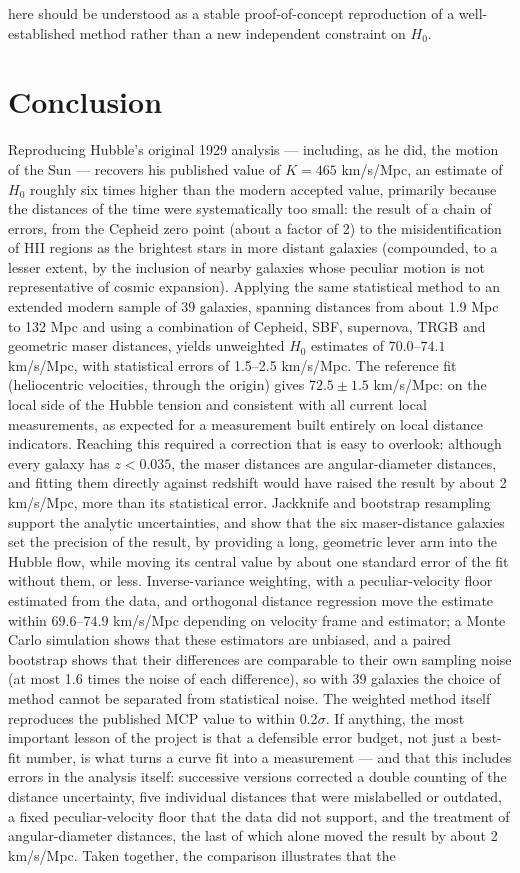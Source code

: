 \documentclass[11pt]{article}
\begin{document}
here should be understood as a stable proof-of-concept reproduction of a well-established method rather than a new independent constraint on $H_0$.
\section{Conclusion}
Reproducing Hubble's original 1929 analysis --- including, as he did, the motion of the Sun --- recovers his published value of $K = 465$ km/s/Mpc, an estimate of $H_0$ roughly six times higher than the modern accepted value, primarily because the distances of the time were systematically too small: the result of a chain of errors, from the Cepheid zero point (about a factor of 2) to the misidentification of HII regions as the brightest stars in more distant galaxies (compounded, to a lesser extent, by the inclusion of nearby galaxies whose peculiar motion is not representative of cosmic expansion). Applying the same statistical method to an extended modern sample of 39 galaxies, spanning distances from about 1.9 Mpc to 132 Mpc and using a combination of Cepheid, SBF, supernova, TRGB and geometric maser distances, yields unweighted $H_0$ estimates of $70.0$--$74.1$ km/s/Mpc, with statistical errors of 1.5--2.5 km/s/Mpc. The reference fit (heliocentric velocities, through the origin) gives $72.5 \pm 1.5$ km/s/Mpc: on the local side of the Hubble tension and consistent with all current local measurements, as expected for a measurement built entirely on local distance indicators. Reaching this required a correction that is easy to overlook: although every galaxy has $z < 0.035$, the maser distances are angular-diameter distances, and fitting them directly against redshift would have raised the result by about 2 km/s/Mpc, more than its statistical error. Jackknife and bootstrap resampling support the analytic uncertainties, and show that the six maser-distance galaxies set the precision of the result, by providing a long, geometric lever arm into the Hubble flow, while moving its central value by about one standard error of the fit without them, or less. Inverse-variance weighting, with a peculiar-velocity floor estimated from the data, and orthogonal distance regression move the estimate within $69.6$--$74.9$ km/s/Mpc depending on velocity frame and estimator; a Monte Carlo simulation shows that these estimators are unbiased, and a paired bootstrap shows that their differences are comparable to their own sampling noise (at most 1.6 times the noise of each difference), so with 39 galaxies the choice of method cannot be separated from statistical noise. The weighted method itself reproduces the published MCP value to within 0.2$\sigma$. If anything, the most important lesson of the project is that a defensible error budget, not just a best-fit number, is what turns a curve fit into a measurement --- and that this includes errors in the analysis itself: successive versions corrected a double counting of the distance uncertainty, five individual distances that were mislabelled or outdated, a fixed peculiar-velocity floor that the data did not support, and the treatment of angular-diameter distances, the last of which alone moved the result by about 2 km/s/Mpc. Taken together, the comparison illustrates that the 
\end{document}
